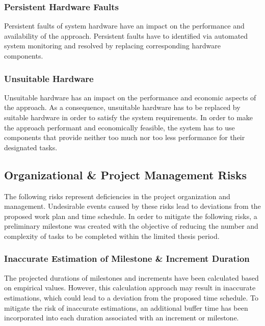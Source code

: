\subsubsection{Persistent Hardware Faults}
Persistent faults of system hardware have an impact on the performance and availability of the approach.
Persistent faults have to identified via automated system monitoring and resolved by replacing corresponding hardware components.

\subsubsection{Unsuitable Hardware}
Unsuitable hardware has an impact on the performance and economic aspects of the approach.
As a consequence, unsuitable hardware has to be replaced by suitable hardware in order to satisfy the system requirements.
In order to make the approach performant and economically feasible, the system has to use components that provide neither too much nor too less performance for their designated tasks.


\subsection{Organizational \& Project Management Risks}
\label{sec:risk_assessment_project_management}
The following risks represent deficiencies in the project organization and management.
Undesirable events caused by these risks lead to deviations from the proposed work plan and time schedule.
In order to mitigate the following risks, a preliminary milestone was created with the objective of reducing the number and complexity of tasks to be completed within the limited thesis period.

\subsubsection{Inaccurate Estimation of Milestone \& Increment Duration}
The projected durations of milestones and increments have been calculated based on empirical values.
However, this calculation approach may result in inaccurate estimations, which could lead to a deviation from the proposed time schedule.
To mitigate the risk of inaccurate estimations, an additional buffer time has been incorporated into each duration associated with an increment or milestone.

